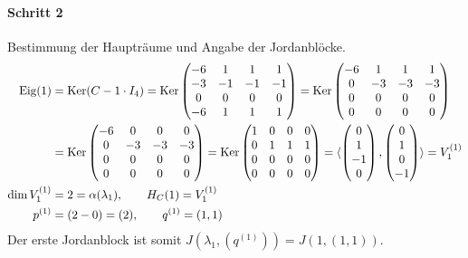 \documentclass{article}
\begin{document}
\paragraph{Schritt 2} Bestimmung der Haupträume und Angabe der Jordanblöcke.
\begin{align*}
\operatorname{Eig}(1) &= \operatorname{Ker}(C - 1\cdot I_4) = \operatorname{Ker}\begin{pmatrix}-6&1&1&1\\-3&-1&-1&-1\\0&0&0&0\\-6&1&1&1\end{pmatrix} = \operatorname{Ker}\begin{pmatrix}-6&1&1&1\\0&-3&-3&-3\\0&0&0&0\\0&0&0&0\end{pmatrix}\\
&= \operatorname{Ker}\begin{pmatrix}-6&0&0&0\\0&-3&-3&-3\\0&0&0&0\\0&0&0&0\end{pmatrix} = \operatorname{Ker}\begin{pmatrix}1&0&0&0\\0&1&1&1\\0&0&0&0\\0&0&0&0\end{pmatrix} = \langle\begin{pmatrix}0\\1\\-1\\0\end{pmatrix},\begin{pmatrix}0\\1\\0\\-1\end{pmatrix}\rangle = V_1^{(1)}\\
\dim V_1^{(1)} &= 2 = \alpha(\lambda_1), \qquad H_C(1) = V_1^{(1)}\\
p^{(1)} &= (2 -0) = (2), \qquad q^{(1)} = (1,1)
\end{align*}
Der erste Jordanblock ist somit $J(\lambda_1,(q^{(1)})) = J(1,(1,1))$.
\end{document}

